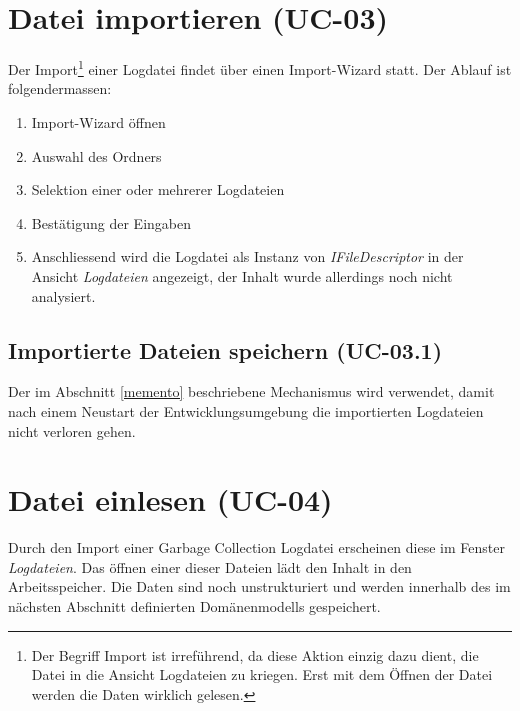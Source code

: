 \section{Datei importieren (UC-03)}
Der Import\footnote{Der Begriff Import ist irreführend, da diese Aktion einzig dazu dient, die Datei in die Ansicht Logdateien zu kriegen. Erst mit dem Öffnen der Datei werden die Daten wirklich gelesen.} einer Logdatei findet über einen Import-Wizard statt. Der Ablauf ist folgendermassen:
\begin{enumerate}
	\item Import-Wizard öffnen
	\item Auswahl des Ordners
	\item Selektion einer oder mehrerer Logdateien
	\item Bestätigung der Eingaben
	\item Anschliessend wird die Logdatei als Instanz von \textit{IFileDescriptor} in der Ansicht \textit{Logdateien} angezeigt, der Inhalt wurde allerdings noch nicht analysiert.
\end{enumerate}

\subsection{Importierte Dateien speichern (UC-03.1)}
Der im Abschnitt \ref{memento} beschriebene Mechanismus wird verwendet, damit nach einem Neustart der Entwicklungsumgebung die importierten Logdateien nicht verloren gehen. 

\section{Datei einlesen (UC-04)}
Durch den Import einer Garbage Collection Logdatei erscheinen diese im Fenster \textit{Logdateien}. Das öffnen einer dieser Dateien lädt den Inhalt in den Arbeitsspeicher. Die Daten sind noch unstrukturiert und werden innerhalb des im nächsten Abschnitt definierten Domänenmodells gespeichert.

